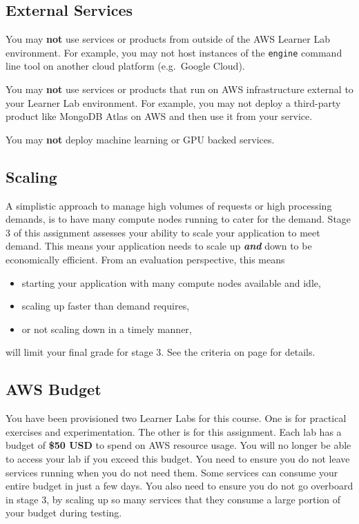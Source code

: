 \documentclass{csse4400}
\begin{document}
\subsection{External Services}
You may \textbf{not} use services or products from outside of the AWS Learner Lab environment.
For example, you may not host instances of the \texttt{engine} command line tool on another cloud platform
(e.g.~Google Cloud).

You may \textbf{not} use services or products that run on AWS infrastructure external to your Learner Lab environment.
For example, you may not deploy a third-party product like MongoDB Atlas on AWS and then use it from your service.

You may \textbf{not} deploy machine learning or GPU backed services.

\subsection{Scaling}
A simplistic approach to manage high volumes of requests or high processing demands,
is to have many compute nodes running to cater for the demand.
Stage 3 of this assignment assesses your ability to scale your application to meet demand.
This means your application needs to scale up \textit{\textbf{and}} down to be economically efficient.
From an evaluation perspective, this means
\begin{itemize}[itemsep=3pt,parsep=3pt,topsep=3pt]
	\item starting your application with many compute nodes available and idle,
	\item scaling up faster than demand requires,
	\item or not scaling down in a timely manner,
\end{itemize}
will limit your final grade for stage 3. See the criteria on page \pageref{criteria} for details.

\subsection{AWS Budget}
You have been provisioned two Learner Labs for this course.
One is for practical exercises and experimentation.
The other is for this assignment.
Each lab has a budget of \textbf{\$50 USD} to spend on AWS resource usage.
You will no longer be able to access your lab if you exceed this budget.
You need to ensure you do not leave services running when you do not need them.
Some services can consume your entire budget in just a few days.
You also need to ensure you do not go overboard in stage 3,
by scaling up so many services that they consume a large portion of your budget during testing.
\end{document}
